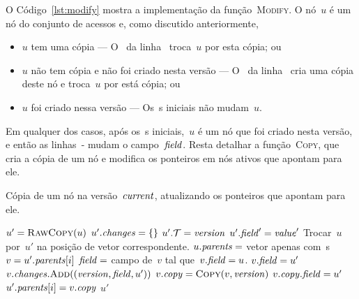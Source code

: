 \documentclass[../../main.tex]{subfiles}
\begin{document}
O Código~\ref{lst:modify} mostra a implementação da função~\textsc{Modify}. O nó~$u$ é um nó do conjunto de acessos e, como discutido anteriormente,
\begin{itemize}
	\item $u$ tem uma cópia --- O~ da linha~ troca~$u$ por esta cópia; ou
	\item $u$ não tem cópia e não foi criado nesta versão --- O~ da linha~ cria uma cópia deste nó e troca~$u$ por está cópia; ou
	\item $u$ foi criado nessa versão --- Os~s iniciais não mudam~$u$.
\end{itemize}

Em qualquer dos casos, após os~s iniciais,~$u$ é um nó que foi criado nesta versão, e então as linhas~- mudam o campo~$\mathit{field}$.
Resta detalhar a função~\textsc{Copy}, que cria a cópia de um nó e modifica os ponteiros em nós ativos que apontam para ele.

\begin{algorithm}
\caption{Cópia de um nó na versão~$\mathit{current}$, atualizando os ponteiros que apontam para ele.} \label{lst:nc_copy}
\begin{algorithmic}[1]

	\State $u' = \Call{RawCopy}{u}$ 
	\State $u'.\mathit{changes} = \{\}$
	\State $u'.\mathcal{T} = \mathit{version}$
		\State $u'.\mathit{field}' = \mathit{value}'$
	\EndFor
		\State Trocar~$u$ por~$u'$ na posição de vetor correspondente.
	\EndIf
	\State {}
		\EndIf
	\EndFor
	\State $u.\mathit{parents} = $ vetor apenas com~s
	 \label{line:copy:parents}
		\State $v = u'.\mathit{parents}[i]$
		\State $\mathit{field} = $ campo de~$v$ tal que~$v.\mathit{field} = u$.
		 
			\State $v.\mathit{field} = u'$
			\State $v.\V{changes}.\Call{Add}{(\V{version}, \V{field}, u')}$
		\Else
			\State $v.\cp = \Call{Copy}{v, \V{version}}$ \label{line:copy:copy}
			\State $v.\mathit{copy}.\mathit{field} = u'$
			\State $u'.\mathit{parents}[i] = v.\mathit{copy}$
		\EndIf
	\EndFor
	\State \Return $u'$
\EndFunction

\end{algorithmic}
\end{algorithm}
\end{document}
